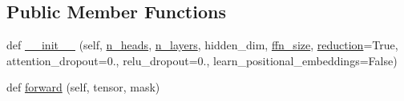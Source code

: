 \subsection*{Public Member Functions}
\begin{DoxyCompactItemize}
\item 
def \hyperlink{classprojects_1_1image__chat_1_1transresnet__multimodal_1_1modules_1_1MultimodalCombiner_a5587602df98b09e9f8871eab1d0d0fa4}{\+\_\+\+\_\+init\+\_\+\+\_\+} (self, \hyperlink{classprojects_1_1image__chat_1_1transresnet__multimodal_1_1modules_1_1MultimodalCombiner_a352d2c87e1084b8d3dfe15346d038184}{n\+\_\+heads}, \hyperlink{classprojects_1_1image__chat_1_1transresnet__multimodal_1_1modules_1_1MultimodalCombiner_af1150161d16875a23fe10f61e7aa1cf8}{n\+\_\+layers}, hidden\+\_\+dim, \hyperlink{classprojects_1_1image__chat_1_1transresnet__multimodal_1_1modules_1_1MultimodalCombiner_a0af7352a16cba4f0c183a50193b33f78}{ffn\+\_\+size}, \hyperlink{classprojects_1_1image__chat_1_1transresnet__multimodal_1_1modules_1_1MultimodalCombiner_a51a70794d4a9d5b8d6b12515833bcad4}{reduction}=True, attention\+\_\+dropout=0., relu\+\_\+dropout=0., learn\+\_\+positional\+\_\+embeddings=False)
\item 
def \hyperlink{classprojects_1_1image__chat_1_1transresnet__multimodal_1_1modules_1_1MultimodalCombiner_a9cbcfc6a2c97c9636ec1f77ce898c6f0}{forward} (self, tensor, mask)
\end{DoxyCompactItemize}
